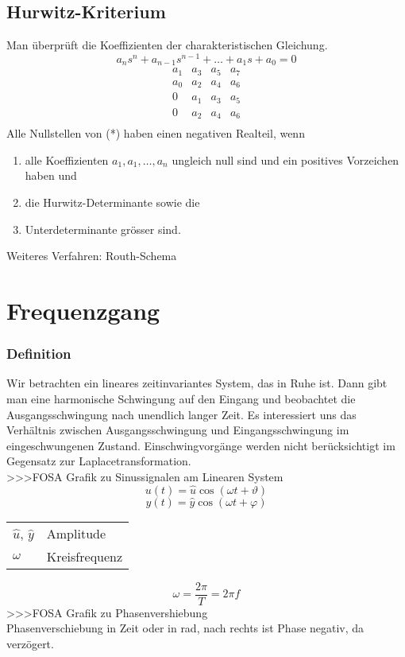 \subsection{Hurwitz-Kriterium}
Man überprüft die Koeffizienten der charakteristischen Gleichung.
\[ a_n s^n + a_{n-1} s^{n-1} + \ldots + a_1 s + a_0 = 0 \]
\[ \begin{array}{cccc}
a_1 & a_3 & a_5 & a_7 \\
a_0 & a_2 & a_4 & a_6 \\
0   & a_1 & a_3 & a_5 \\
0   & a_2 & a_4 & a_6 \\
\end{array} \]
Alle Nullstellen von (*) haben einen negativen Realteil, wenn 
\begin{enumerate} 
  \item alle Koeffizienten $a_1, a_1, \ldots, a_n$ ungleich null sind und ein 
        positives Vorzeichen haben und 
  \item die Hurwitz-Determinante sowie die 
  \item Unterdeterminante grösser sind. 
\end{enumerate}
Weiteres Verfahren: Routh-Schema

\section{Frequenzgang}
\subsubsection{Definition}
Wir betrachten ein lineares zeitinvariantes System, das in Ruhe ist. 
Dann gibt man eine harmonische Schwingung auf den Eingang und beobachtet die 
Ausgangsschwingung nach unendlich langer Zeit. Es interessiert uns das 
Verhältnis zwischen Ausgangsschwingung und Eingangsschwingung im 
eingeschwungenen Zustand. Einschwingvorgänge werden nicht berücksichtigt im 
Gegensatz zur Laplacetransformation. \\
>>>FOSA Grafik zu Sinussignalen am Linearen System
\[ u(t) = \hat{u} \cos(\omega t + \vartheta) \]
\[ y(t) = \hat{y} \cos(\omega t + \varphi) \]
\begin{tabular}{ll}
$\hat{u}$, $\hat{y}$ & Amplitude \\
$\omega$          & Kreisfrequenz \\
\end{tabular}
\[ \omega = \frac{2 \pi}{T} = 2 \pi f \]
>>>FOSA Grafik zu Phasenvershiebung\\
Phasenverschiebung in Zeit oder in rad, nach rechts ist Phase negativ, da 
verzögert. 

